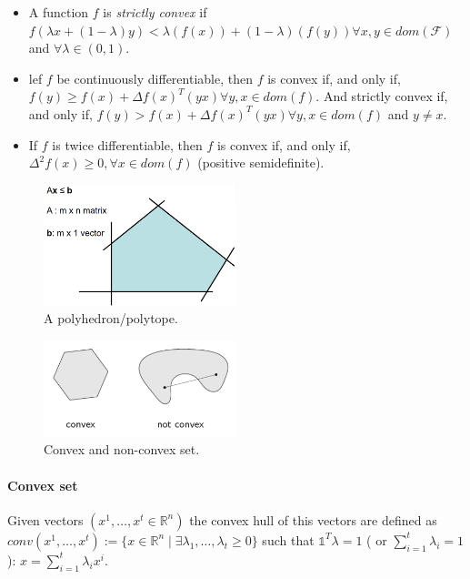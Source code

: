 \documentclass[main]{subfiles}
\begin{document}
\begin{itemize}
\item A function $f$ is \emph{strictly convex} if $f(\lambda x + (1-\lambda)y)
< \lambda (f(x)) + (1-\lambda)(f(y)) \forall x, y \in dom(\mathcal{F})$ and
$\forall \lambda \in (0,1)$.

\item lef $f$ be continuously differentiable, then $f$ is convex if, and only
if, $f(y) \geq f(x) + \Delta f(x)^{T}(yx) \forall y,x \in dom(f)$. And strictly
convex if, and only if, $f(y) > f(x) + \Delta f(x)^{T}(yx) \forall y,x \in
dom(f)$ and $y \neq x$.

\item If $f$ is twice differentiable, then $f$ is convex if, and only if,
$\Delta^{2} f(x) \geq 0, \forall x \in dom(f)$ (positive semidefinite).
\end{itemize}

\begin{figure}
  \label{fig:polyhedron}
  \caption{A polyhedron/polytope.}
  \centering
    \includegraphics[width=0.5\textwidth]{imgs/polyhedron.png}
\end{figure}

\begin{figure}
  \label{fig:convex-set}
  \caption{Convex and non-convex set.}
  \centering
    \includegraphics[width=0.5\textwidth]{imgs/convex-set.png}
\end{figure}


\paragraph{Convex set}
Given vectors $(x^{1}, \dots, x^{t} \in \mathbb{R}^{n})$ the convex hull of
this vectors are defined as $conv(x^{1}, \dots, x^{t}):= \{ x \in
\mathbb{R}^{n} \mid \exists \lambda_{1}, \dots, \lambda_{t} \geq 0 \}$ such
that $\mathds{1}^{T} \lambda = 1$ ( or $\sum_{i=1}^{t} \lambda_{i} = 1$):
$x = \sum_{i=1}^{t} \lambda_{i} x^{i}$.
\end{document}
